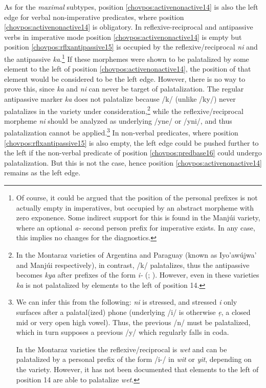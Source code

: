 \documentclass[output=paper]{langscibook}
\begin{document}
As for the \textit{maximal} subtypes, position \ref{chovpos:activenonactive14} is also the left edge for verbal non-imperative predicates, where position \ref{chovpos:activenonactive14} is obligatory. In reflexive-reciprocal and antipassive verbs in imperative mode position \ref{chovpos:activenonactive14} is empty but position \ref{chovpos:rflxantipassive15} is occupied by the reflexive/reciprocal \textit{ni} and the antipassive \textit{ka}.\footnote{Of course, it could be argued that the position of the personal prefixes is not actually empty in imperatives, but occupied by an abstract morpheme with zero exponence. Some indirect support for this is found in the Manjúi variety, where an optional \textit{a-} second person prefix for imperative exists. In any case, this implies no changes for the diagnostics.} If these morphemes were shown to be palatalized by some element to the left of position \ref{chovpos:activenonactive14}, the position of that element would be considered to be the left edge. However, there is no way to prove this, since \textit{ka} and \textit{ni} can never be target of palatalization. The regular antipassive marker \textit{ka} does not palatalize because /k/ (unlike /ky/) never palatalizes in the variety under consideration,\footnote{In the Montaraz varieties of Argentina and Paraguay (known as Iyo'awújwa' and Manjúi respectively), in contrast, /k/ palatalizes, thus the antipassive becomes \textit{kya} after prefixes of the form \textit{i-} (\citealt{Gerzenstein1983}; \citealt{Carol2018}). However, even in these varieties \textit{ka} is not palatalized by elements to the left of position 14.} while the reflexive/reciprocal morpheme \textit{ni} should be analyzed as underlying  /yne/ or /yni/, and thus  palatalization cannot be applied.\footnote{We can infer this from the following: \textit{ni} is stressed, and stressed \textit{i} only surfaces after a palatal(ized) phone (underlying /i/ is otherwise \textit{ẹ}, a closed mid or very open high vowel). Thus, the previous /n/ must be palatalized, which in turn supposes a previous /y/ which regularly falls in coda.


In the Montaraz varieties the reflexive/reciprocal is \textit{wet} and can be palatalized by a personal prefix of the form /i-/ in \textit{wit} or \textit{yit}, depending on the variety. However, it has not been documented that elements to the left of position 14 are able to palatalize \textit{wet}.} In non-verbal predicates, where position \ref{chovpos:rflxantipassive15} is also empty, the left edge could be pushed further to the left if the non-verbal predicate of position \ref{chovpos:predbase16} could undergo palatalization. But this is not the case, hence position \ref{chovpos:activenonactive14} remains as the left edge.
\end{document}
